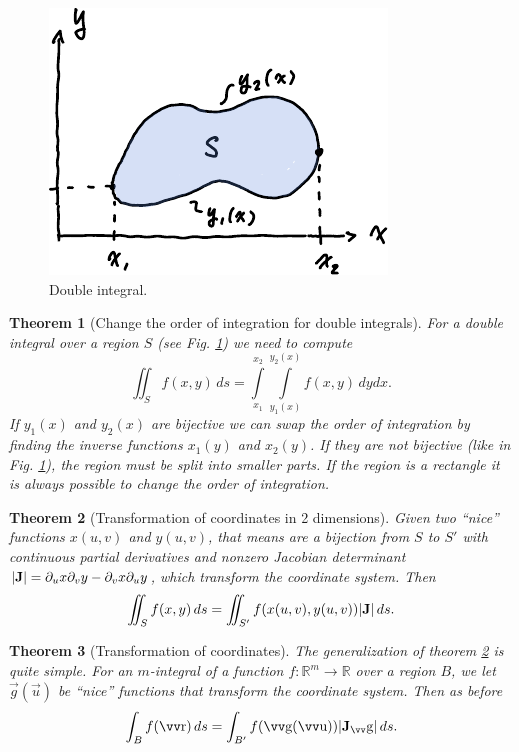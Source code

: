 \documentclass[twocolumn, margin=small]{tex/hsrzf}
\theoremstyle{fuvarzf}
\newtheorem{theorem}{Theorem}
\begin{document}
\begin{figure}
  \centering
  \includegraphics{img/double-integral}
  \caption{
    Double integral.
    \label{fig:double-integral}
  }
\end{figure}

\begin{theorem}[Change the order of integration for double integrals] For a
  double integral over a region \(S\) (see Fig.  \ref{fig:double-integral}) we
  need to compute
  \[
    \iint_S f(x,y) \,ds =
      \int\limits_{x_1}^{x_2} \int\limits_{y_1(x)}^{y_2(x)} f(x,y) \,dydx .
  \]
  If \(y_1(x)\) and \(y_2(x)\) are bijective we can swap the order of
  integration by finding the inverse functions \(x_1(y)\) and \(x_2(y)\). If
  they are not bijective (like in Fig. \ref{fig:double-integral}), the region
  must be split into smaller parts. If the region is a rectangle it is always
  possible to change the order of integration.
\end{theorem}

\begin{theorem}[Transformation of coordinates in 2 dimensions]
  \label{thm:transform-coords}
  Given two ``nice'' functions \(x(u,v)\) and \(y(u,v)\), that means are a
  bijection from \(S\) to \(S'\) with continuous partial derivatives and
  nonzero Jacobian determinant \(|\bm{\mathrm{J}}| = \partial_u x \partial_v y -
  \partial_v x \partial_u y\), which transform the coordinate system. Then
  \[
    \iint_S f(x,y) \,ds = \iint_{S'} f(x(u,v), y(u,v)) |\bm{\mathrm{J}}| \,ds .
  \]
\end{theorem}

\begin{theorem}[Transformation of coordinates]
  The generalization of theorem \ref{thm:transform-coords} is quite simple.
  For an \(m\)-integral of a function \(f:\mathbb{R}^m\to\mathbb{R}\) over a
  region \(B\), we let \(\vec{g}(\vec{u})\) be ``nice'' functions that
  transform the coordinate system. Then as before
  \[
    \int_B f(\vec{r}) \,ds = \int_{B'} f(\vec{g}(\vec{u})) |\mx{J}_\vec{g}| \,ds .
  \]
\end{theorem}
\end{document}
